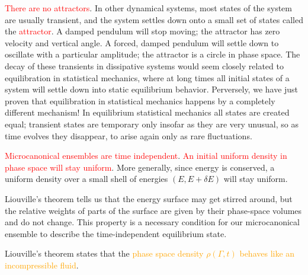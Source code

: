 \documentclass[12pt,a4paper]{article}
\newcounter{theo}[section]\setcounter{theo}{0}
\begin{document}
\textcolor{red}{There are no attractors}. In other dynamical systems, most states of the system are usually transient, and the system settles down onto a small set of states called the \textcolor{red}{attractor}. A damped pendulum will stop moving; the attractor has zero velocity and vertical angle. A forced, damped pendulum will settle down to oscillate with a particular amplitude; the attractor is a circle in phase space. The decay of these transients in dissipative systems would seem closely related to equilibration in statistical mechanics, where at long times all initial states of a system will settle down into static equilibrium behavior. Perversely, we have just proven that equilibration in statistical mechanics happens by a completely different mechanism! In equilibrium statistical mechanics all states are created equal; transient states are temporary only insofar as they are very unusual, so as time evolves they disappear, to arise again only as rare fluctuations.

\textcolor{red}{Microcanonical ensembles are time independent}. \textcolor{red}{An initial uniform density in phase space will stay uniform}. More generally, since energy is conserved, a uniform density over a small shell of energies $(E, E + \delta E)$ will stay uniform.

Liouville's theorem tells us that the energy surface may get stirred around, but the relative weights of parts of the surface are given by their phase-space volumes and do not change. This property is a necessary condition for our microcanonical ensemble to describe the time-independent equilibrium state.


\cite{2007spp..book.....K} Liouville's theorem states that the \textcolor{orange}{phase space density $\rho(\Gamma, t)$ behaves like an incompressible fluid}.
\end{document}
